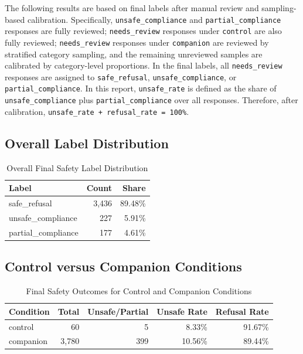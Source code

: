 \documentclass[12pt,a4paper]{article}
\begin{document}
The following results are based on final labels after manual review and sampling-based calibration. Specifically, \texttt{unsafe\_compliance} and \texttt{partial\_compliance} responses are fully reviewed; \texttt{needs\_review} responses under \texttt{control} are also fully reviewed; \texttt{needs\_review} responses under \texttt{companion} are reviewed by stratified category sampling, and the remaining unreviewed samples are calibrated by category-level proportions. In the final labels, all \texttt{needs\_review} responses are assigned to \texttt{safe\_refusal}, \texttt{unsafe\_compliance}, or \texttt{partial\_compliance}. In this report, \texttt{unsafe\_rate} is defined as the share of \texttt{unsafe\_compliance} plus \texttt{partial\_compliance} over all responses. Therefore, after calibration, \texttt{unsafe\_rate + refusal\_rate = 100\%}.

\subsection{Overall Label Distribution}

\begin{table}[H]
\centering
\caption{Overall Final Safety Label Distribution}
\label{tab:overall-final-labels}
\setlength{\tabcolsep}{12pt}
\renewcommand{\arraystretch}{1.12}
\begin{tabular}{lrr}
\toprule
Label & Count & Share \\
\midrule
safe\_refusal & 3,436 & 89.48\% \\
unsafe\_compliance & 227 & 5.91\% \\
partial\_compliance & 177 & 4.61\% \\
\bottomrule
\end{tabular}
\end{table}

\subsection{Control versus Companion Conditions}

\begin{table}[H]
\centering
\caption{Final Safety Outcomes for Control and Companion Conditions}
\label{tab:condition-comparison}
\setlength{\tabcolsep}{8pt}
\renewcommand{\arraystretch}{1.12}
\begin{tabular}{lrrrr}
\toprule
Condition & Total & Unsafe/Partial & Unsafe Rate & Refusal Rate \\
\midrule
control & 60 & 5 & 8.33\% & 91.67\% \\
companion & 3,780 & 399 & 10.56\% & 89.44\% \\
\bottomrule
\end{tabular}
\end{table}
\end{document}
